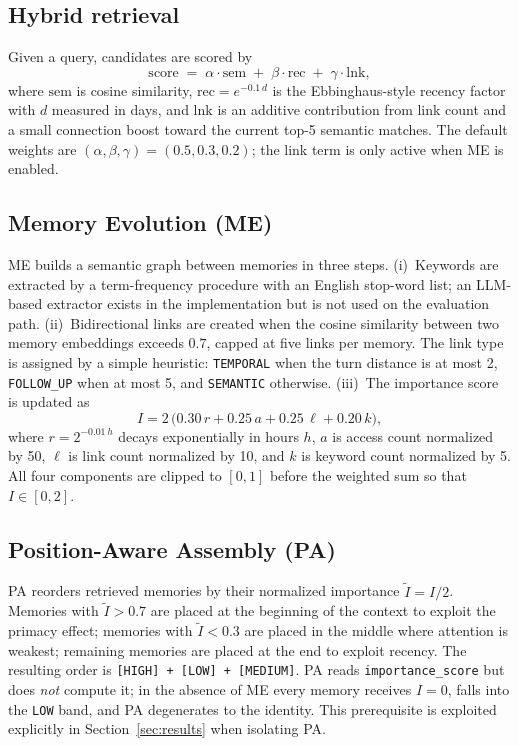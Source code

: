 \documentclass[conference]{IEEEtran}
\begin{document}
\subsection{Hybrid retrieval}
Given a query, candidates are scored by
\begin{equation}
\label{eq:hybrid}
\mathrm{score}\;=\;\alpha\cdot \mathrm{sem}\;+\;\beta\cdot \mathrm{rec}\;+\;\gamma\cdot \mathrm{lnk},
\end{equation}
where $\mathrm{sem}$ is cosine similarity, $\mathrm{rec}=e^{-0.1\,d}$ is the Ebbinghaus-style recency factor with $d$ measured in days, and $\mathrm{lnk}$ is an additive contribution from link count and a small connection boost toward the current top-5 semantic matches. The default weights are $(\alpha,\beta,\gamma)=(0.5,0.3,0.2)$; the link term is only active when ME is enabled.

\subsection{Memory Evolution (ME)}
ME builds a semantic graph between memories in three steps. (i)~Keywords are extracted by a term-frequency procedure with an English stop-word list; an LLM-based extractor exists in the implementation but is not used on the evaluation path. (ii)~Bidirectional links are created when the cosine similarity between two memory embeddings exceeds $0.7$, capped at five links per memory. The link type is assigned by a simple heuristic: \texttt{TEMPORAL} when the turn distance is at most 2, \texttt{FOLLOW\_UP} when at most 5, and \texttt{SEMANTIC} otherwise. (iii)~The importance score is updated as
\begin{equation}
\label{eq:importance}
I = 2\,\big(0.30\,r + 0.25\,a + 0.25\,\ell + 0.20\,k\big),
\end{equation}
where $r=2^{-0.01\,h}$ decays exponentially in hours $h$, $a$ is access count normalized by 50, $\ell$ is link count normalized by 10, and $k$ is keyword count normalized by 5. All four components are clipped to $[0,1]$ before the weighted sum so that $I\in[0,2]$.

\subsection{Position-Aware Assembly (PA)}
PA reorders retrieved memories by their normalized importance $\tilde{I}=I/2$. Memories with $\tilde{I}>0.7$ are placed at the beginning of the context to exploit the primacy effect; memories with $\tilde{I}<0.3$ are placed in the middle where attention is weakest; remaining memories are placed at the end to exploit recency. The resulting order is \texttt{[HIGH]\,+\,[LOW]\,+\,[MEDIUM]}. PA reads \texttt{importance\_score} but does \emph{not} compute it; in the absence of ME every memory receives $I=0$, falls into the \texttt{LOW} band, and PA degenerates to the identity. This prerequisite is exploited explicitly in Section~\ref{sec:results} when isolating PA.
\end{document}
